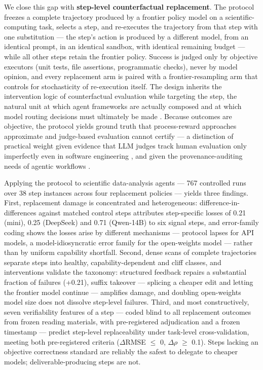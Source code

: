 We close this gap with \textbf{step-level counterfactual replacement}. The protocol freezes a complete trajectory produced by a frontier policy model on a scientific-computing task, selects a step, and re-executes the trajectory from that step with one substitution --- the step's action is produced by a different model, from an identical prompt, in an identical sandbox, with identical remaining budget --- while all other steps retain the frontier policy. Success is judged only by objective executors (unit tests, file assertions, programmatic checks), never by model opinion, and every replacement arm is paired with a frontier-resampling arm that controls for stochasticity of re-execution itself. The design inherits the intervention logic of counterfactual evaluation while targeting the step, the natural unit at which agent frameworks are actually composed and at which model routing decisions must ultimately be made \cite{li2026progrouter,sun2026cborchestrator}. Because outcomes are objective, the protocol yields ground truth that process-reward approaches approximate and judge-based evaluation cannot certify --- a distinction of practical weight given evidence that LLM judges track human evaluation only imperfectly even in software engineering \cite{wang2025llms}, and given the provenance-auditing needs of agentic workflows \cite{souza2025agents}.

Applying the protocol to scientific data-analysis agents --- 767 controlled runs over 38 step instances across four replacement policies --- yields three findings. First, replacement damage is concentrated and heterogeneous: difference-in-differences against matched control steps attributes step-specific losses of 0.21 (mini), 0.25 (DeepSeek) and 0.71 (Qwen-14B) to six signal steps, and error-family coding shows the losses arise by different mechanisms --- protocol lapses for API models, a model-idiosyncratic error family for the open-weights model --- rather than by uniform capability shortfall. Second, dense scans of complete trajectories separate steps into healthy, capability-dependent and cliff classes, and interventions validate the taxonomy: structured feedback repairs a substantial fraction of failures (+0.21), suffix takeover --- splicing a cheaper edit and letting the frontier model continue --- amplifies damage, and doubling open-weights model size does not dissolve step-level failures. Third, and most constructively, seven verifiability features of a step --- coded blind to all replacement outcomes from frozen reading materials, with pre-registered adjudication and a frozen timestamp --- predict step-level replaceability under task-level cross-validation, meeting both pre-registered criteria ($\Delta$RMSE $\leq$ 0, $\Delta$$\rho$ $\geq$ 0.1). Steps lacking an objective correctness standard are reliably the safest to delegate to cheaper models; deliverable-producing steps are not.

